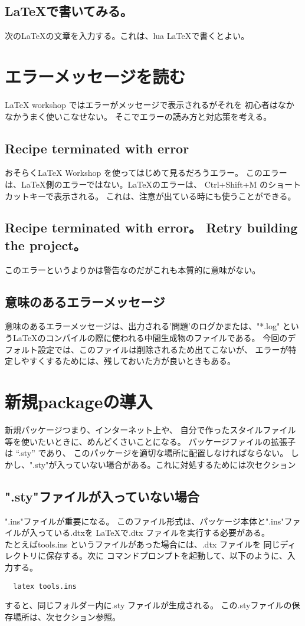 \documentclass{ltjsarticle}
\begin{document}
\subsection{\LaTeX で書いてみる。}
次の\LaTeX の文章を入力する。これは、lua \LaTeX で書くとよい。


\section{エラーメッセージを読む}
LaTeX workshop ではエラーがメッセージで表示されるがそれを
初心者はなかなかうまく使いこなせない。
そこでエラーの読み方と対応策を考える。
\subsection{Recipe terminated with error}
おそらくLaTeX Workshop を使ってはじめて見るだろうエラー。
このエラーは、LaTeX側のエラーではない。LaTeXのエラーは、
Ctrl+Shift+M のショートカットキーで表示される。
これは、注意が出ている時にも使うことができる。
\subsection{Recipe terminated with error。 Retry building the project。}
このエラーというよりかは警告なのだがこれも本質的に意味がない。
\subsection{意味のあるエラーメッセージ}
意味のあるエラーメッセージは、出力される'問題'のログかまたは、"*.log"
というLaTeXのコンパイルの際に使われる中間生成物のファイルである。
今回のデフォルト設定では、このファイルは削除されるため出てこないが、
エラーが特定しやすくするためには、残しておいた方が良いときもある。

\section{新規packageの導入}
新規パッケージつまり、インターネット上や、
自分で作ったスタイルファイル等を使いたいときに、めんどくさいことになる。
パッケージファイルの拡張子は “.sty” であり、
このパッケージを適切な場所に配置しなければならない。
しかし、".sty"が入っていない場合がある。これに対処するためには次セクション
\subsection{".sty"ファイルが入っていない場合}
".ins"ファイルが重要になる。
このファイル形式は、パッケージ本体と".ins"ファイルが入っている.dtxを
LaTeXで.dtx ファイルを実行する必要がある。\\
たとえばtools.ins というファイルがあった場合には、.dtx ファイルを
同じディレクトリに保存する。次に
コマンドプロンプトを起動して、以下のように、入力する。
\begin{verbatim}
  latex tools.ins
\end{verbatim}
すると、同じフォルダー内に.sty ファイルが生成される。
この.styファイルの保存場所は、次セクション参照。
\end{document}

